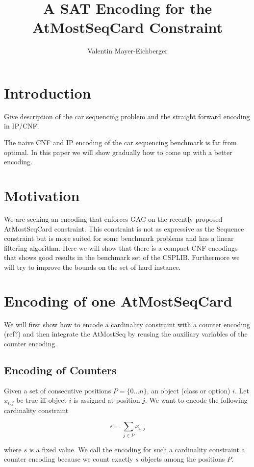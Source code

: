 \documentclass[]{llncs}
\author{Valentin Mayer-Eichberger}
\institute{NICTA \\ University of New South Wales \\
\email{valentin.mayer-eichberger@nicta.com.au}}
\title{A SAT Encoding for the AtMostSeqCard Constraint}
\begin{document}
 \maketitle

\section{Introduction}

Give description of the car sequencing problem and the straight
forward encoding in IP/CNF. 

The naive CNF and IP encoding of the car sequencing benchmark is
far from optimal. In this paper we will show gradually how to come up
with a better encoding. 

\section{Motivation}

We are seeking an encoding that enforces GAC on the recently proposed
AtMostSeqCard constraint. This constraint is not as expressive as the
Sequence constraint but is more suited for some benchmark problems and
has a linear filtering algorithm. Here we will show that there is a
compact CNF encodings that shows good results in the benchmark set of
the CSPLIB. Furthermore we will try to improve the bounds on the set of
hard instance. 

\section{Encoding of one AtMostSeqCard}

We will first show how to encode a cardinality constraint with a counter
encoding (ref?) and then integrate the AtMostSeq by reusing the auxiliary
variables of the counter encoding. 

\subsection{Encoding of Counters}

Given a set of consecutive positions $P=\{0\ldots n\}$, an object (class
or option) $i$. Let $x_{i,j}$ be true iff object $i$ is assigned at
position $j$.  We want to encode the following cardinality constraint

$$ s = \sum_{j\in P} x_{i,j} $$

where $s$ is a fixed value.  We call the encoding for such a cardinality
constraint a counter encoding because we count exactly $s$ objects among
the positions $P$. 
\end{document}
